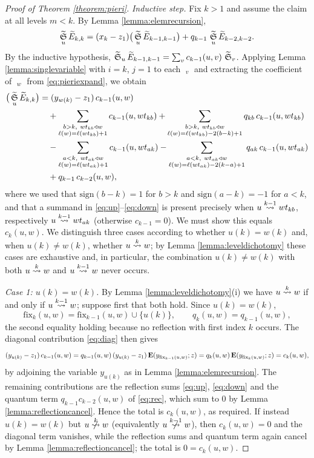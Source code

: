 \documentclass{amsart}
\theoremstyle{definition}
\theoremstyle{remark}
\numberwithin{equation}{section}
\DeclareMathOperator{\qsch}{\widetilde{\mathfrak{S}}}
\newcommand{\xrightsquigarrow}[2][]{%
	\mathrel{\mathop{\rightsquigarrow}\limits^{\scriptstyle #2}%
	\ifx\hfuzz#1\hfuzz\else_{\scriptstyle #1}\fi}%
}
\newcommand{\tom}[1]{\ensuremath{\xrightsquigarrow{#1}}}
\newcommand{\fx}{\mathrm{fix}}
\begin{document}
\begin{proof}[Proof of Theorem \ref{theorem:pieri}]
\emph{Inductive step.} Fix $k>1$ and assume the claim at all levels $m<k$. By Lemma \ref{lemma:elemrecursion},
\begin{equation}\label{eq:pieriexpand}
\qsch_u\qelem_{k,k}=(x_k-z_1)\big(\qsch_u\qelem_{k-1,k-1}\big)+q_{k-1}\,\qsch_u\qelem_{k-2,k-2}.
\end{equation}
By the inductive hypothesis, $\qsch_u\qelem_{k-1,k-1}=\sum_v c_{k-1}(u,v)\,\qsch_v$. Applying Lemma \ref{lemma:singlevariable} with $i=k$, $j=1$ to each $\qsch_v$ and extracting the coefficient of $\qsch_w$ from \eqref{eq:pieriexpand}, we obtain
\begin{align}
[\qsch_w]\big(\qsch_u\qelem_{k,k}\big)
&=(y_{w(k)}-z_1)\,c_{k-1}(u,w) \label{eq:diag}\\
&\quad+\sum_{\substack{b>k,\ w t_{kb}\lup w\\ \ell(w)=\ell(wt_{kb})+1}} c_{k-1}(u,wt_{kb})
+\sum_{\substack{b>k,\ w t_{kb}\lup w\\ \ell(w)=\ell(wt_{kb})-2(b-k)+1}} q_{kb}\,c_{k-1}(u,wt_{kb}) \label{eq:up}\\
&\quad-\sum_{\substack{a<k,\ w t_{ak}\lup w\\ \ell(w)=\ell(wt_{ak})+1}} c_{k-1}(u,wt_{ak})
-\sum_{\substack{a<k,\ w t_{ak}\lup w\\ \ell(w)=\ell(wt_{ak})-2(k-a)+1}} q_{ak}\,c_{k-1}(u,wt_{ak}) \label{eq:down}\\
&\quad+q_{k-1}\,c_{k-2}(u,w), \label{eq:rec}
\end{align}
where we used that $\mathrm{sign}(b-k)=1$ for $b>k$ and $\mathrm{sign}(a-k)=-1$ for $a<k$, and that a summand in \eqref{eq:up}--\eqref{eq:down} is present precisely when $u\tom{k-1}wt_{kb}$, respectively $u\tom{k-1}wt_{ak}$ (otherwise $c_{k-1}=0$). We must show this equals $c_k(u,w)$. We distinguish three cases according to whether $u(k)=w(k)$ and, when $u(k)\neq w(k)$, whether $u\tom{k}w$; by Lemma \ref{lemma:leveldichotomy} these cases are exhaustive and, in particular, the combination $u(k)\neq w(k)$ with both $u\tom{k}w$ and $u\tom{k-1}w$ never occurs.

\emph{Case 1: $u(k)=w(k)$.} By Lemma \ref{lemma:leveldichotomy}(i) we have $u\tom{k}w$ if and only if $u\tom{k-1}w$; suppose first that both hold. Since $u(k)=w(k)$,
$$\fx_{k}(u,w)=\fx_{{k-1}}(u,w)\cup\{u(k)\},\qquad q_k(u,w)=q_{k-1}(u,w),$$
the second equality holding because no reflection with first index $k$ occurs. The diagonal contribution \eqref{eq:diag} then gives
$$(y_{u(k)}-z_1)\,c_{k-1}(u,w)=q_{k-1}(u,w)\,(y_{u(k)}-z_1)\,\wte(y_{\fx_{{k-1}}(u,w)};z)=q_k(u,w)\,\wte(y_{\fx_{k}(u,w)};z)=c_k(u,w),$$
by adjoining the variable $y_{u(k)}$ as in Lemma \ref{lemma:elemrecursion}. The remaining contributions are the reflection sums \eqref{eq:up}, \eqref{eq:down} and the quantum term $q_{k-1}c_{k-2}(u,w)$ of \eqref{eq:rec}, which sum to $0$ by Lemma \ref{lemma:reflectioncancel}. Hence the total is $c_k(u,w)$, as required. If instead $u(k)=w(k)$ but $u\ntom{k}w$ (equivalently $u\ntom{k-1}w$), then $c_k(u,w)=0$ and the diagonal term vanishes, while the reflection sums and quantum term again cancel by Lemma \ref{lemma:reflectioncancel}; the total is $0=c_k(u,w)$.


\end{proof}
\end{document}
